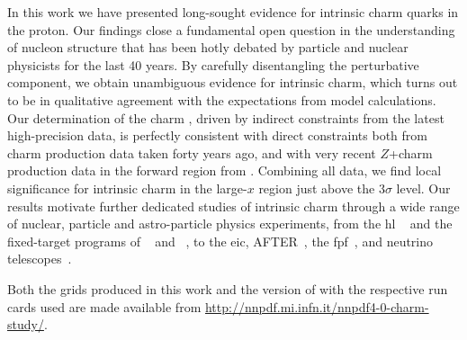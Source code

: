 
In this work we have presented long-sought evidence for intrinsic charm quarks
in the proton.
%
Our findings close a fundamental open question in the understanding of nucleon
structure that has been hotly debated by particle and nuclear physicists for
the last 40 years.
%
By carefully disentangling the perturbative component, we obtain unambiguous
evidence for intrinsic charm, which turns out to be in qualitative agreement
with the expectations from model calculations.
%
Our determination of the charm \pdf, driven by indirect constraints from the 
latest high-precision \lhc data, is perfectly consistent with direct
constraints both from \emc charm production data taken forty years ago, and
with very recent $Z$+charm production data in the forward region from \lhcb.
%
Combining all data, we find local significance for intrinsic charm in the
large-$x$ region just above the $3\sigma$ level.
%
Our results motivate further dedicated studies of intrinsic charm through a
wide range of nuclear, particle and astro-particle physics experiments, from
the \acrlong{hl} \lhc~\cite{Azzi:2019yne} and the fixed-target programs of
\lhcb~\cite{LHCb:2018jry} and \alice~\cite{QCDWorkingGroup:2019dyv}, to the  
\acrlong{eic}, AFTER~\cite{Hadjidakis:2018ifr}, the
\acrlong{fpf}~\cite{Anchordoqui:2021ghd}, and neutrino
telescopes~\cite{Halzen:2016thi}.

Both the \lhapdf grids produced in this work and the version of \eko with the
respective run cards used are made available from
\url{http://nnpdf.mi.infn.it/nnpdf4-0-charm-study/}.
